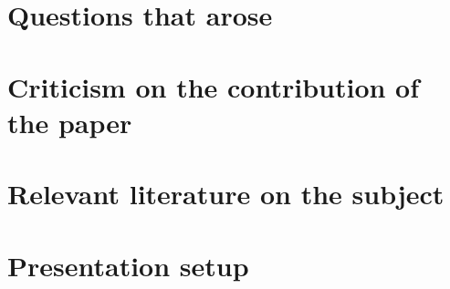 \documentclass[runningheads,a4paper]{llncs}
\begin{document}
\section{Questions that arose}

\section{Criticism on the contribution of the paper}

\section{Relevant literature on the subject}

\section{Presentation setup}
\end{document}
